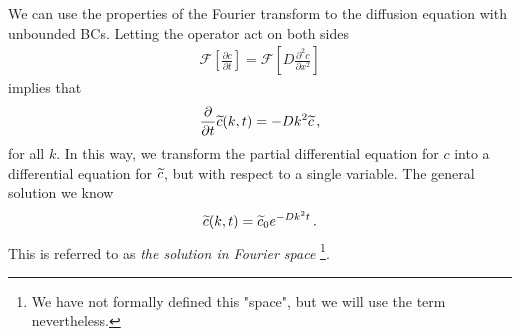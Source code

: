 \noindent We can use the properties of the Fourier transform to the diffusion equation with unbounded BCs. 
Letting the operator act on both sides
\begin{eqnarray}
	\mathcal{F}\left[\frac{\partial c}{\partial t}\right] = \mathcal{F}\left[D \frac{\partial^2c}{\partial x^2}\right]
\end{eqnarray}
implies that 
\begin{eqnarray}
	\frac{\partial}{\partial t}  \widetilde{c}(k, t) = -D k^2 \widetilde{c} \, ,
\end{eqnarray}
for all $k$. In this way, we transform the partial differential equation for $c$ 
into a differential equation for $\widetilde{c}$, but with respect to a single variable. The general solution we know 
\begin{eqnarray}
	\label{eq:fouriersol}
	\widetilde{c}(k, t) = \widetilde{c}_0 e^{-Dk^2t} \, .
\end{eqnarray}
This is referred to as \emph{the solution in Fourier space} \footnote{We have not formally defined this "space", 
but we will use the term nevertheless.}. 

